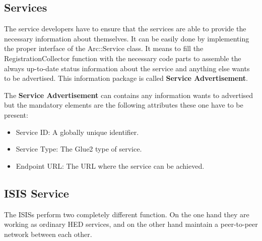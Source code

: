 \documentclass{article}                            %
\begin{document}
\subsection{Services}
\label{Services}
The service developers have to ensure that the services are able to provide the necessary information about themselves. It can be easily done by implementing the proper interface of the Arc::Service class. It means to fill the RegistrationCollector function with the necessary code parts to assemble the always up-to-date status information about the service and anything else wants to be advertised. This information package is called \textbf{Service Advertisement}.\par
\label{Service Advertisement}
The \textbf{Service Advertisement} can contains any information wants to advertised but the mandatory elements are the following attributes these one have to be present:
\begin{itemize}
  \item Service ID: A globally unique identifier.
  \item Service Type: The Glue2 type of service.
  \item Endpoint URL: The URL where the service can be achieved.
\end{itemize}
\subsection{ISIS Service}
\label{ISIS Service}
The ISISs perform two completely different function. On the one hand they are working as ordinary HED services, and on the other hand maintain a peer-to-peer network between each other.
\end{document}
